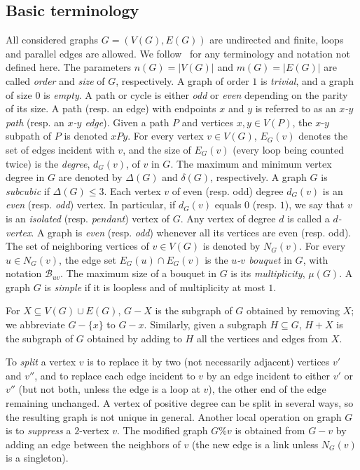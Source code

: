 \documentclass[a4paper,12pt]{article}
\numberwithin{equation}{section}
\begin{document}
\subsection{Basic terminology}

All considered graphs $G=(V(G),E(G))$ are undirected and finite, loops and parallel edges are allowed. We follow~\cite{BonMur08} for any terminology and notation not defined here. The parameters $n(G)=|V(G)|$ and $m(G)=|E(G)|$ are called \textit{order} and \textit{size} of $G$, respectively. A graph of order $1$ is \textit{trivial}, and a graph of size $0$ is \textit{empty}. A path or cycle is either \textit{odd} or \textit{even} depending on the parity of its size. A path (resp. an edge) with endpoints $x$ and $y$ is referred to as an \textit{$x$-$y$ path} (resp. an \textit{$x$-$y$ edge}). Given a path $P$ and vertices $x,y\in V(P)$, the $x$-$y$ subpath of $P$ is denoted $xPy$.
For every vertex $v\in V(G)$, $E_G(v)$ denotes the set of edges incident with $v$, and the size of $E_G(v)$ (every loop being counted twice) is the \textit{degree}, $d_{G}(v)$, of $v$ in $G$. The maximum and minimum vertex degree in $G$ are denoted by $\Delta(G)$ and $\delta(G)$, respectively.  A graph $G$ is \textit{subcubic} if $\Delta(G)\leq 3$. Each vertex $v$ of even (resp. odd) degree $d_{G}(v)$ is an \textit{even} (resp. \textit{odd}) vertex. In particular, if $d_G(v)$ equals $0$ (resp. $1$), we say that $v$ is an \textit{isolated} (resp. \textit{pendant}) vertex of $G$. Any vertex of degree $d$ is called a \textit{$d$-vertex}. A graph is \textit{even} (resp. \textit{odd})
whenever all its vertices are even (resp. odd).
The set of neighboring vertices of $v\in V(G)$ is denoted by $N_G(v)$. For every $u\in N_G(v)$, the edge set $E_G(u)\cap E_G(v)$ is the \textit{$u$-$v$ bouquet} in $G$, with notation $\mathcal{B}_{uv}$.  The maximum size of a bouquet in $G$ is its \textit{multiplicity}, $\mu(G)$. A graph $G$ is \textit{simple} if it is loopless and of multiplicity at most $1$.

For $X\subseteq V(G)\cup E(G)$, $G-X$ is the subgraph of $G$ obtained by removing $X$; we abbreviate $G-\{x\}$ to $G-x$. Similarly, given a subgraph $H\subseteq G$, $H+X$ is the subgraph of $G$ obtained by adding to $H$ all the vertices and edges from $X$.

To \textit{split} a vertex $v$ is to replace it by two (not necessarily adjacent) vertices $v'$ and $v''$, and to replace each edge incident to $v$ by an edge incident to either $v'$ or $v''$ (but not both, unless the edge is a loop at $v$), the other end of the edge remaining unchanged. A vertex of positive degree can be split in several ways, so the resulting graph is not unique in general. Another local operation on graph $G$ is to \textit{suppress} a $2$-vertex $v$. The modified graph $G\%v$ is obtained from $G-v$ by adding an edge between the neighbors of $v$ (the new edge is a link unless $N_G(v)$ is a singleton).
\end{document}
